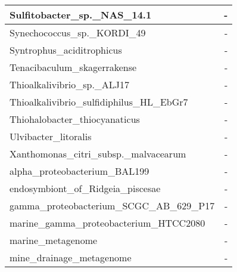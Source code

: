 \documentclass[12pt,a4paper]{article}
\begin{document}
\begin{table}[ht]
\begin{center}
\begin{tabular}{|l*{1}{|r}|}
Sulfitobacter\_sp.\_NAS\_14.1 & - \\ \hline
Synechococcus\_sp.\_KORDI\_49 & - \\ \hline
Syntrophus\_aciditrophicus & - \\ \hline
Tenacibaculum\_skagerrakense & - \\ \hline
Thioalkalivibrio\_sp.\_ALJ17 & - \\ \hline
Thioalkalivibrio\_sulfidiphilus\_HL\_EbGr7 & - \\ \hline
Thiohalobacter\_thiocyanaticus & - \\ \hline
Ulvibacter\_litoralis & - \\ \hline
Xanthomonas\_citri\_subsp.\_malvacearum & - \\ \hline
alpha\_proteobacterium\_BAL199 & - \\ \hline
endosymbiont\_of\_Ridgeia\_piscesae & - \\ \hline
gamma\_proteobacterium\_SCGC\_AB\_629\_P17 & - \\ \hline
marine\_gamma\_proteobacterium\_HTCC2080 & - \\ \hline
marine\_metagenome & - \\ \hline
mine\_drainage\_metagenome & - \\ \hline
\end{tabular}
\end{center}
\end{table}
\end{document}
